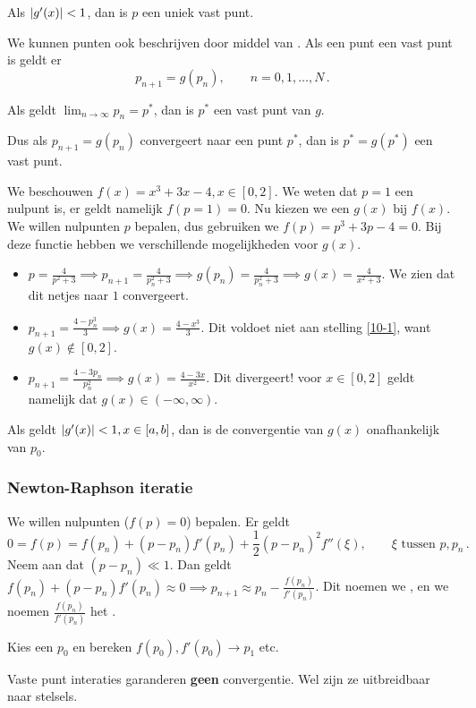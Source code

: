 \documentclass{2wn20summary}
\begin{document}
				\begin{theonum}\label{10-2}
					Als $ {\left|g'(x)\right|} < 1 $, dan is $p$ een uniek vast punt.
				\end{theonum}
				We kunnen punten ook beschrijven door middel van . Als een punt een vast punt is geldt er
				\[ 
					p_{n+1} = g(p_n), \qquad n=0,1,\dotsc,N\,.
				\]
				\begin{theorem}
					Als geldt $ \lim_{n \to \infty}p_n = p^* $, dan is $p^*$ een vast punt van $g$.
				\end{theorem}
				Dus als $ p_{n+1} = g(p_n) $ convergeert naar een punt $p^*$, dan is $ p^*=g(p^*) $ een vast punt.
				
				\begin{voorbeeld}
					We beschouwen $ f(x) = x^3 + 3x - 4, x \in [0,2] $. We weten dat $p=1$ een nulpunt is, er geldt namelijk $ f(p=1)=0 $. Nu kiezen we een $g(x)$ bij $f(x)$. We willen nulpunten $p$ bepalen, dus gebruiken we $ f(p) = p^3 + 3p - 4 = 0 $. Bij deze functie hebben we verschillende mogelijkheden voor $g(x)$.
					\begin{itemize}
						\item $ p = \frac{4}{p^2+3} \implies p_{n+1}=\frac{4}{p_n^2 + 3} \implies g(p_n) = \frac{4}{p_n^2 + 3} \implies g(x) = \frac{4}{x^2 + 3}$. We zien dat dit netjes naar $1$ convergeert.
						\item $ p_{n+1} = \frac{4-p_n^3}{3} \implies g(x) = \frac{4-x^3}{3} $. Dit voldoet niet aan stelling \ref{10-1}, want $ g(x) \not \in [0,2] $.
						\item $ p_{n+1} = \frac{4-3p_n}{p_n^2} \implies g(x) = \frac{4-3x}{x^2}$. Dit divergeert! voor $ x \in [0,2] $ geldt namelijk dat $ g(x) \in (-\infty,\infty) $.
					\end{itemize}
				\end{voorbeeld}
				
				\begin{theorem}
					Als geldt $ {\left|g'(x)\right|}< 1, x \in [a,b] $, dan is de convergentie van $g(x)$ onafhankelijk van $ p_0 $. 
				\end{theorem}
				
			\subsubsection{Newton-Raphson iteratie}
				We willen nulpunten ($ f(p)=0 $) bepalen. Er geldt
				\[ 
					0 = f(p) = f(p_n) + (p-p_n)f'(p_n) + \frac{1}{2}(p-p_n)^2 f''(\xi), \qquad \xi \text { tussen } p,p_n\,.
				\]
				Neem aan dat $ (p-p_n) \ll 1$. Dan geldt $ f(p_n) + (p-p_n)f'(p_n) \approx 0 \implies p_{n+1} \approx p_n - \frac{f(p_n)}{f'(p_n)} $. Dit noemen we , en we noemen $ \frac{f(p_n)}{f'(p_n)} $ het . 
				
				Kies een $ p_0 $ en bereken $ f(p_0), f'(p_0) \to p_1$ etc.
				
				\begin{opm}
					Vaste punt interaties garanderen \textbf{geen} convergentie. Wel zijn ze uitbreidbaar naar stelsels.
				\end{opm}

	\newpage
	\printindex
	
	
\end{document}

